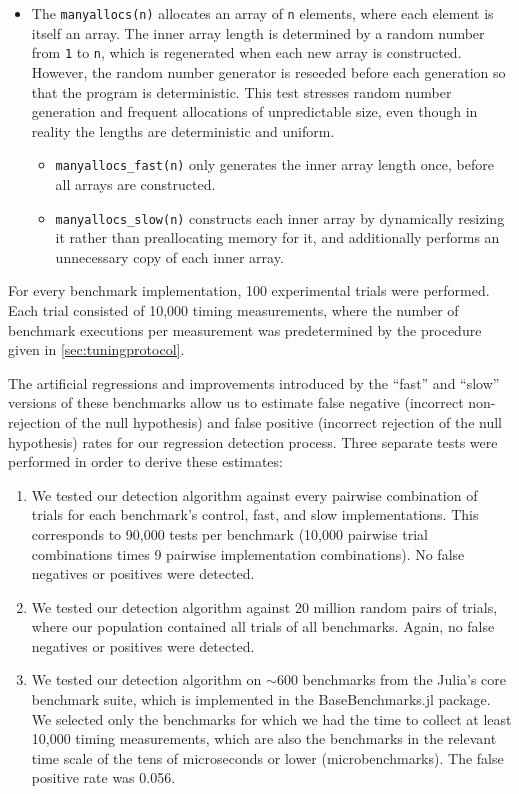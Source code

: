 \documentclass[conference]{IEEEtran}
\begin{document}
\begin{itemize}
\begin{itemize}
    \end{itemize}
    \item The \lstinline|manyallocs(n)| allocates an array of \lstinline|n| elements, where each element is itself an array. The inner array length is determined by a random number from \lstinline|1| to \lstinline|n|, which is regenerated when each new array is constructed. However, the random number generator is reseeded before each generation so that the program is deterministic. This test stresses random number generation and frequent allocations of unpredictable size, even though in reality the lengths are deterministic and uniform.
    \begin{itemize}
        \item \lstinline|manyallocs_fast(n)| only generates the inner array length once, before all arrays are constructed.
        \item \lstinline|manyallocs_slow(n)| constructs each inner array by dynamically resizing it rather than preallocating memory for it, and additionally performs an unnecessary copy of each inner array.
    \end{itemize}
\end{itemize}

For every benchmark implementation, 100 experimental trials were performed. Each trial consisted of 10,000 timing measurements, where the number of benchmark executions per measurement was predetermined by the procedure given in \ref{sec:tuningprotocol}.

The artificial regressions and improvements introduced by the ``fast'' and ``slow'' versions of these benchmarks allow us to estimate false negative (incorrect non-rejection of the null hypothesis) and false positive (incorrect rejection of the null hypothesis) rates for our regression detection process. Three separate tests were performed in order to derive these estimates:

\begin{enumerate}
\item We tested our detection algorithm against every pairwise combination of trials for each benchmark's control, fast, and slow implementations. This corresponds to 90,000 tests per benchmark (10,000 pairwise trial combinations times 9 pairwise implementation combinations). No false negatives or positives were detected.
\item We tested our detection algorithm against 20 million random pairs of trials, where our population contained all trials of all benchmarks. Again, no false negatives or positives were detected.
\item We tested our detection algorithm on $\sim$600 benchmarks from the Julia's core benchmark suite, which is implemented in the BaseBenchmarks.jl package. We selected only the benchmarks for which we had the time to collect at least 10,000 timing measurements, which are also the benchmarks in the relevant time scale of the tens of microseconds or lower (microbenchmarks). The false positive rate was 0.056.
\end{enumerate}
\end{document}
